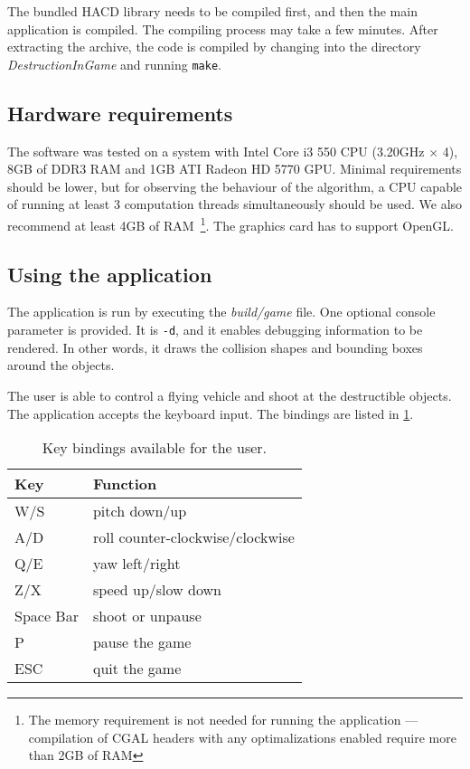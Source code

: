 The bundled HACD library needs to be compiled first, and then the main application is compiled. The compiling process may take a few minutes. After extracting the archive, the code is compiled by changing into the directory \emph{DestructionInGame} and running \texttt{make}.

\subsection*{Hardware requirements}
The software was tested on a system with Intel Core i3 550 CPU (3.20GHz $\times$ 4), 8GB of DDR3 RAM and 1GB ATI Radeon HD 5770 GPU. Minimal requirements should be lower, but for observing the behaviour of the algorithm, a CPU capable of running at least 3 computation threads simultaneously should be used. We also recommend at least 4GB of RAM~\footnote{The memory requirement is not needed for running the application --- compilation of CGAL headers with any optimalizations enabled require more than 2GB of RAM}. The graphics card has to support OpenGL.

\subsection*{Using the application}
The application is run by executing the \emph{build/game} file. One optional console parameter is provided. It is {\tt -d}, and it enables debugging information to be rendered. In other words, it draws the collision shapes and bounding boxes around the objects.

The user is able to control a flying vehicle and shoot at the destructible objects. The application accepts the keyboard input. The bindings are listed in \cref{tab:keys}.

\begin{table}

\centering
  \begin{tabular}{ll}
  Key & Function \\
  \hline
  W/S & pitch down/up \\
  A/D & roll counter-clockwise/clockwise \\
  Q/E & yaw left/right \\
  Z/X & speed up/slow down \\
  Space Bar & shoot or unpause \\ 
  P & pause the game \\
  ESC & quit the game \\
  \end{tabular}
\caption{Key bindings available for the user.}
\label{tab:keys}

\end{table}

